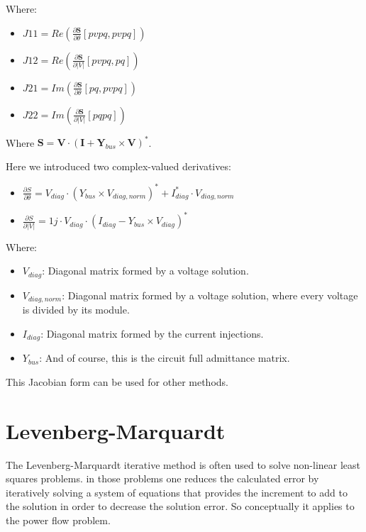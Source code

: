 \documentclass[11pt,fleqn]{book} %
\begin{document}
Where:

\begin{itemize}
	\item $J11 = Re\left(\frac{\partial \textbf{S}}{\partial \theta}[pvpq, pvpq]\right)$  
	\item $J12 = Re\left(\frac{\partial \textbf{S}}{\partial |V|}[pvpq, pq]\right)$
	\item $J21 = Im\left(\frac{\partial \textbf{S}}{\partial \theta}[pq, pvpq]\right)$
	\item $J22 = Im\left(\frac{\partial \textbf{S}}{\partial |V|}[pq pq]\right)$\newline
\end{itemize}

Where
$
\textbf{S} = \textbf{V} \cdot (\textbf{I} + \textbf{Y}_{bus} \times \textbf{V})^*
$.

Here we introduced two complex-valued derivatives:\newline

\begin{itemize}
	\item $\frac{\partial S}{\partial \theta} = V_{diag} \cdot (Y_{bus} \times V_{diag,norm})^* + I_{diag}^* \cdot V_{diag,norm}$ 
	\item $\frac{\partial S}{\partial |V|} =  1j \cdot V_{diag} \cdot (I_{diag} - Y_{bus} \times V_{diag})^*$\newline
\end{itemize}

Where:

\begin{itemize}
	\item $V_{diag}$: Diagonal matrix formed by a voltage solution.
	\item $V_{diag,norm}$: Diagonal matrix formed by a voltage solution, where every voltage is divided by its module.
	\item $I_{diag}$: Diagonal matrix formed by the current injections.
	\item $Y_{bus}$: And of course, this is the circuit full admittance matrix. \newline
\end{itemize}

This Jacobian form can be used for other methods.

\section{Levenberg-Marquardt}

The Levenberg-Marquardt iterative method is often used to solve non-linear least squares problems. in those problems one reduces the calculated error by iteratively solving a system of equations that provides the increment to add to the solution in order to decrease the solution error. So conceptually it applies to the power flow problem.
\end{document}

